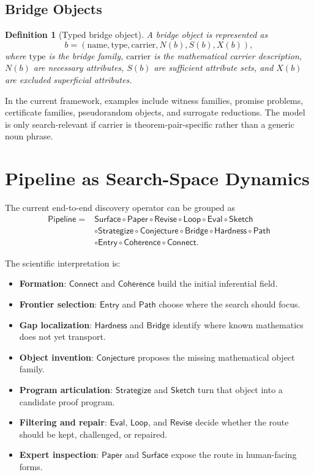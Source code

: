 \documentclass[11pt]{article}
\newtheorem{definition}{Definition}
\begin{document}
\subsection{Bridge Objects}

\begin{definition}[Typed bridge object]
A bridge object is represented as
\[
b = (\mathrm{name}, \mathrm{type}, \mathrm{carrier}, N(b), S(b), X(b)),
\]
where $\mathrm{type}$ is the bridge family, $\mathrm{carrier}$ is the mathematical carrier description, $N(b)$ are necessary attributes, $S(b)$ are sufficient attribute sets, and $X(b)$ are excluded superficial attributes.
\end{definition}

In the current framework, examples include witness families, promise problems, certificate families, pseudorandom objects, and surrogate reductions. The model is only search-relevant if $\mathrm{carrier}$ is theorem-pair-specific rather than a generic noun phrase.

\section{Pipeline as Search-Space Dynamics}

The current end-to-end discovery operator can be grouped as
\[
\begin{aligned}
\mathsf{Pipeline}
= {} & \mathsf{Surface}
\circ
\mathsf{Paper}
\circ
\mathsf{Revise}
\circ
\mathsf{Loop}
\circ
\mathsf{Eval}
\circ
\mathsf{Sketch} \\
& \circ
\mathsf{Strategize}
\circ
\mathsf{Conjecture}
\circ
\mathsf{Bridge}
\circ
\mathsf{Hardness}
\circ
\mathsf{Path} \\
& \circ
\mathsf{Entry}
\circ
\mathsf{Coherence}
\circ
\mathsf{Connect}.
\end{aligned}
\]

The scientific interpretation is:

\begin{itemize}[leftmargin=*,itemsep=0.25em]
\item \textbf{Formation}: $\mathsf{Connect}$ and $\mathsf{Coherence}$ build the initial inferential field.
\item \textbf{Frontier selection}: $\mathsf{Entry}$ and $\mathsf{Path}$ choose where the search should focus.
\item \textbf{Gap localization}: $\mathsf{Hardness}$ and $\mathsf{Bridge}$ identify where known mathematics does not yet transport.
\item \textbf{Object invention}: $\mathsf{Conjecture}$ proposes the missing mathematical object family.
\item \textbf{Program articulation}: $\mathsf{Strategize}$ and $\mathsf{Sketch}$ turn that object into a candidate proof program.
\item \textbf{Filtering and repair}: $\mathsf{Eval}$, $\mathsf{Loop}$, and $\mathsf{Revise}$ decide whether the route should be kept, challenged, or repaired.
\item \textbf{Expert inspection}: $\mathsf{Paper}$ and $\mathsf{Surface}$ expose the route in human-facing forms.
\end{itemize}
\end{document}
